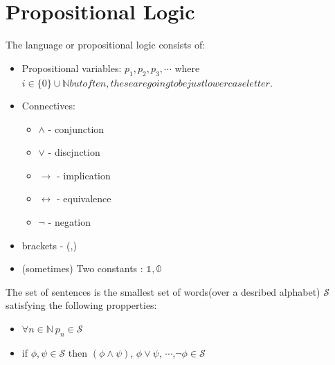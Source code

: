 
\chapter{Propositional Logic}
{The language or propositional logic consists of:
        \begin{itemize}
                \item Propositional variables: $p_1,p_2,p_3,\cdots$ where $i \in \{0\}\cup \mathbb{N} but often, these are going to be just lowercase letter$.
                \item Connectives:
                        \begin{itemize}
                                \item $\wedge$ - conjunction
                                \item  $\vee$ - discjnction 
                                \item $\rightarrow$ - implication
                                \item $\leftrightarrow$ - equivalence
                                \item  $\neg$ - negation
                        \end{itemize}
                 \item brackets - (,)
                 \item (sometimes) Two constants : $\mathbb{1},\mathbb{0}$


        \end{itemize}        
}

{
 The set of sentences is the smallest set of words(over a desribed alphabet) $\mathcal{S}$ satisfying the following propperties:
        \begin{itemize}
                \item $\forall n \in \mathbb{N} \: p_n \in \mathcal{S}$ 
                \item if $\phi, \psi \in \mathcal{S}$ then $(\phi \wedge \psi)$, $\phi \vee \psi$, $\cdots$,$\neg \phi \in \mathcal{S}$ 
        \end{itemize}


}




